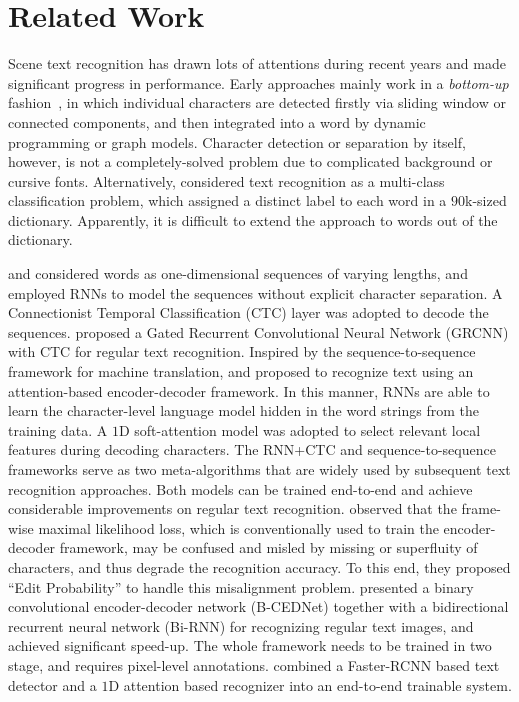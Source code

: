 \documentclass[letterpaper]{article} \usepackage{aaai19}  \usepackage{times}  \usepackage{helvet}  \usepackage{courier}  \usepackage{url}  \usepackage{graphicx}  \usepackage{amsmath}
\begin{document}
\section{Related Work}
\label{sec:ReWork}
Scene text recognition has drawn lots of attentions during recent years and made significant progress in performance.
Early approaches mainly work in a \textit{bottom-up} fashion~\cite{Wangkai2011,MishraCVPR2012,SVTP,YaoCVPR2014}, in which individual characters are detected firstly via sliding window or connected components, and then integrated into a word by dynamic programming or graph models. Character detection or separation by itself, however, is not a completely-solved problem due to complicated background or cursive fonts.
Alternatively, \cite{Max2016IJCV} considered text recognition as a multi-class classification problem, which assigned a distinct label to each word in a $90$k-sized dictionary. Apparently, it is difficult to extend the approach to words out of the dictionary.

\cite{He2015Reading} and \cite{ShiBY15} considered words as one-dimensional sequences of varying lengths,
and employed RNNs to model the sequences without explicit character separation.
A Connectionist Temporal Classification (CTC) layer was adopted to decode the sequences.
\cite{OCRNIPS17} proposed a Gated Recurrent Convolutional Neural Network (GRCNN) with CTC for regular text recognition.
Inspired by the sequence-to-sequence framework for machine translation, \cite{Lee_2016_CVPR} and \cite{shiCVPR2016} proposed to recognize text using an attention-based encoder-decoder framework. In this manner, RNNs are able to learn the character-level language model hidden in the word strings from the training data. A $1$D soft-attention model was adopted to select relevant local features during decoding characters.
The RNN+CTC and sequence-to-sequence frameworks serve as two meta-algorithms that are widely used by subsequent text recognition approaches.
Both models can be trained end-to-end and achieve considerable improvements on regular text recognition.
\cite{cheng_EditDistance} observed that the frame-wise maximal likelihood loss, which is conventionally used to train the encoder-decoder framework, may be
confused and misled by missing or superfluity of characters, and thus degrade the recognition accuracy.
To this end, they proposed ``Edit Probability'' to handle this misalignment problem.
\cite{SqueezeText18} presented a binary convolutional encoder-decoder network (B-CEDNet) together with a bidirectional recurrent neural network (Bi-RNN) for recognizing regular text images, and achieved significant speed-up.
The whole framework needs to be trained in two stage, and requires pixel-level annotations.
\cite{li2017towards} combined a Faster-RCNN based text detector and a $1$D attention based recognizer into an end-to-end trainable system.
\end{document}
